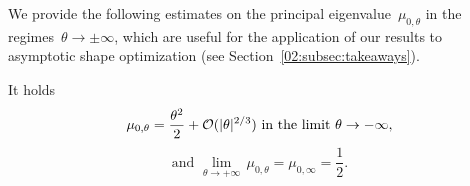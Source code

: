     We provide the following estimates on the principal eigenvalue~$\mu_{0,\theta}$ in the regimes~$\theta\to\pm\infty$, which are useful for the application of our results to asymptotic shape optimization (see Section~\ref{02:subsec:takeaways}).
    \begin{lemma}
        \label{02:lemma:principal_eigenvalue_dirichlet}
        It holds
        \begin{equation}
            \label{02:eq:principal_eigenvalue_dirichlet}
            \mu_{0,\theta} = \frac{\theta^2}2 + \mathcal{O}(|\theta|^{2/3})\text{ in the limit }\theta\to-\infty,
        \end{equation}
        \begin{equation}
            \label{02:eq:principal_eigenvalue_infinity}
            \text{and }\underset{\theta\to +\infty}{\lim}\,\mu_{0,\theta}= \mu_{0,\infty}= \frac12.
        \end{equation}
    \end{lemma}
